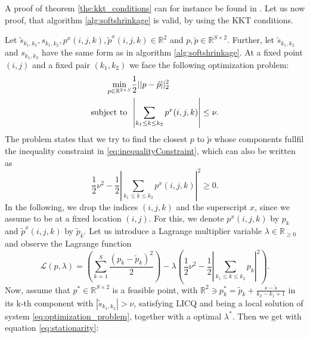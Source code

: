 \documentclass{scrreprt}
\newenvironment{proof}[1][Proof]{\begin{trivlist}
\item[\hskip \labelsep {\bfseries #1}]}{\end{trivlist}}
\begin{document}
        A proof of theorem \ref{the:kkt_conditions} can for instance be found in \cite{Nocedal-Wright}. Let us now proof, that algorithm \ref{alg:softshrinkage} is valid, by using the KKT conditions.

        \begin{proof}
            Let $\tilde{s}_{k_{1}, k_{2}}, s_{k_{1}, k_{2}}, p^{x}(i,j,k), \tilde{p}^{x}(i,j,k) \in \mathbb{R}^{2}$ and $p, \tilde{p} \in \mathbb{R}^{S \times 2}$. Further, let $\tilde{s}_{k_{1}, k_{2}}$ and $ s_{k_{1}, k_{2}}$ have the same form as in algorithm \ref{alg:softshrinkage}. At a fixed point $(i, j)$ and a fixed pair $(k_{1}, k_{2})$ we face the following optimization problem:
            \begin{subequations}
                \begin{align}
                \min\limits_{p \in \mathbb{R}^{2 \times S}} &\frac{1}{2} ||p - \tilde{p}||^{2}_{2} \\
                \textnormal{subject to} \,\,\, &\left| \sum_{k_{1} \le k \le k_{2}} p^{x}(i,j,k) \right| \le \nu. \label{eq:inequalityConstraint}
                \end{align}
                \label{eq:optimization_problem}
            \end{subequations}
            The problem states that we try to find the closest $p$ to $\tilde{p}$ whose components fullfil the inequality constraint in \ref{eq:inequalityConstraint}, which can also be written as
                $$
                    \frac{1}{2} \nu^{2} - \frac{1}{2} \left| \sum_{k_{1} \le k \le k_{2}} p^{x}(i,j,k) \right|^{2} \ge 0.
                $$
            In the following, we drop the indices $(i,j,k)$ and the superscript $x$, since we assume to be at a fixed location $(i,j)$. For this, we denote $p^{x}(i,j,k)$ by $p_{k}$ and $\tilde{p}^{x}(i,j,k)$ by $\tilde{p}_{k}$. Let us introduce a Lagrange multiplier variable $\lambda \in \mathbb{R}_{\ge 0}$ and observe the Lagrange function
                $$
                    \mathcal{L}(p, \lambda) = \left( \sum_{k = 1}^{S} \frac{(p_{k} - \tilde{p}_{k})^{2}}{2} \right) - \lambda \left( \frac{1}{2} \nu^{2} - \frac{1}{2} \left| \sum_{k_{1} \le k \le k_{2}} p_{k} \right|^{2} \right).
                $$
            Now, assume that $p^{\ast} \in \mathbb{R}^{S \times 2}$ is a feasible point, with $\mathbb{R}^{2} \ni p^{\ast}_{k} = \tilde{p}_{k} + \frac{s - \tilde{s}}{k_{2} - k_{1} + 1}$ in its k-th component with $|\tilde{s}_{k_{1}, k_{2}}| > \nu$, satisfying LICQ and being a local solution of system \ref{eq:optimization_problem}, together with a optimal $\lambda^{\ast}$. Then we get with equation \ref{eq:stationarity}:

\end{proof}
\end{document}
